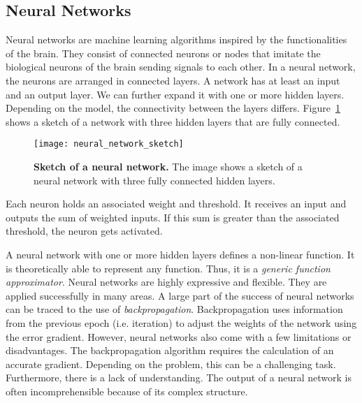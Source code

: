 \subsection{Neural Networks}
Neural networks are machine learning algorithms inspired by the functionalities of the brain. They consist of connected neurons or nodes that imitate the biological neurons of the brain sending signals to each other. In a neural network, the neurons are arranged in connected layers. A network has at least an input and an output layer. We can further expand it with one or more hidden layers. Depending on the model, the connectivity between the layers differs. Figure~\ref{fig:neural_network_sketch} shows a sketch of a network with three hidden layers that are fully connected.
\begin{figure}[ht]
\centering
\texttt{[image: neural\_network\_sketch]}
\caption[Sketch of a Neural Network]{
  \textbf{Sketch of a neural network.}
  The image shows a sketch of a neural network with three fully connected hidden layers.
}
\label{fig:neural_network_sketch}
\end{figure}
Each neuron holds an associated weight and threshold. It receives an input and outputs the sum of weighted inputs. If this sum is greater than the associated threshold, the neuron gets activated.

A neural network with one or more hidden layers defines a non-linear function. It is theoretically able to represent any function. Thus, it is a \textit{generic function approximator}.
Neural networks are highly expressive and flexible. They are applied successfully in many areas. A large part of the success of neural networks can be traced to the use of \textit{backpropagation}. Backpropagation uses information from the previous epoch (i.e. iteration) to adjust the weights of the network using the error gradient. However, neural networks also come with a few limitations or disadvantages. The backpropagation algorithm requires the calculation of an accurate gradient. Depending on the problem, this can be a challenging task. Furthermore, there is a lack of understanding. The output of a neural network is often incomprehensible because of its complex structure.




